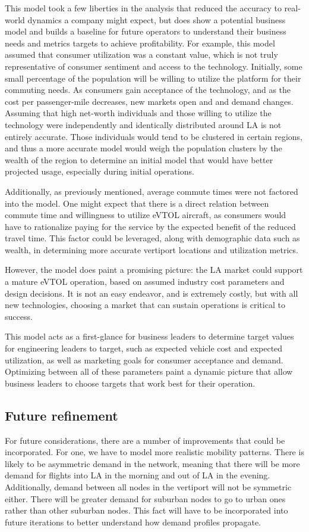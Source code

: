 \documentclass{article}
\begin{document}
This model took a few liberties in the analysis that reduced the accuracy to real-world dynamics a company might expect, but does show a potential business model and builds a baseline for future operators to understand their business needs and metrics targets to achieve profitability. For example, this model assumed that consumer utilization was a constant value, which is not truly representative of consumer sentiment and access to the technology. Initially, some small percentage of the population will be willing to utilize the platform for their commuting needs. As consumers gain acceptance of the technology, and as the cost per passenger-mile decreases, new markets open and and demand changes. Assuming that high net-worth individuals and those willing to utilize the technology were independently and identically distributed around LA is not entirely accurate. Those individuals would tend to be clustered in certain regions, and thus a more accurate model would weigh the population clusters by the wealth of the region to determine an initial model that would have better projected usage, especially during initial operations.

Additionally, as previously mentioned, average commute times were not factored into the model. One might expect that there is a direct relation between commute time and willingness to utilize eVTOL aircraft, as consumers would have to rationalize paying for the service by the expected benefit of the reduced travel time. This factor could be leveraged, along with demographic data such as wealth, in determining more accurate vertiport locations and utilization metrics.

However, the model does paint a promising picture: the LA market could support a mature eVTOL operation, based on assumed industry cost parameters and design decisions. It is not an easy endeavor, and is extremely costly, but with all new technologies, choosing a market that can sustain operations is critical to success.

This model acts as a first-glance for business leaders to determine target values for engineering leaders to target, such as expected vehicle cost and expected utilization, as well as marketing goals for consumer acceptance and demand. Optimizing between all of these parameters paint a dynamic picture that allow business leaders to choose targets that work best for their operation. 

\subsection{Future refinement}
For future considerations, there are a number of improvements that could be incorporated. For one, we have to model more realistic mobility patterns. There is likely to be asymmetric demand in the network, meaning that there will be more demand for flights into LA in the morning and out of LA in the evening. Additionally, demand between all nodes in the vertiport will not be symmetric either. There will be greater demand for suburban nodes to go to urban ones rather than other suburban nodes. This fact will have to be incorporated into future iterations to better understand how demand profiles propagate.
\end{document}
